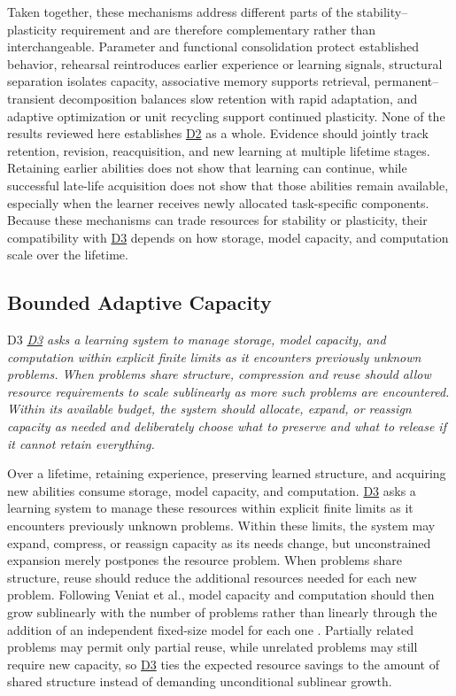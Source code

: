 \documentclass[10pt,journal,compsoc]{IEEEtran}
\DeclareRobustCommand{\Dref}[1]{\hyperref[sec:d#1]{D#1}}
\begin{document}
Taken together, these mechanisms address different parts of the stability--plasticity requirement and are therefore complementary rather than interchangeable.
Parameter and functional consolidation protect established behavior, rehearsal reintroduces earlier experience or learning signals, structural separation isolates capacity, associative memory supports retrieval, permanent--transient decomposition balances slow retention with rapid adaptation, and adaptive optimization or unit recycling support continued plasticity.
None of the results reviewed here establishes \Dref{2} as a whole.
Evidence should jointly track retention, revision, reacquisition, and new learning at multiple lifetime stages.
Retaining earlier abilities does not show that learning can continue, while successful late-life acquisition does not show that those abilities remain available, especially when the learner receives newly allocated task-specific components.
Because these mechanisms can trade resources for stability or plasticity, their compatibility with \Dref{3} depends on how storage, model capacity, and computation scale over the lifetime.

\subsection{Bounded Adaptive Capacity}
\label{sec:d3}

\begin{briefbox}[systembrief]{D3}
    \emph{\Dref{3} asks a learning system to manage storage, model capacity, and computation within explicit finite limits as it encounters previously unknown problems.
    When problems share structure, compression and reuse should allow resource requirements to scale sublinearly as more such problems are encountered.
    Within its available budget, the system should allocate, expand, or reassign capacity as needed and deliberately choose what to preserve and what to release if it cannot retain everything.}
\end{briefbox}

\noindent Over a lifetime, retaining experience, preserving learned structure, and acquiring new abilities consume storage, model capacity, and computation.
\Dref{3} asks a learning system to manage these resources within explicit finite limits as it encounters previously unknown problems.
Within these limits, the system may expand, compress, or reassign capacity as its needs change, but unconstrained expansion merely postpones the resource problem.
When problems share structure, reuse should reduce the additional resources needed for each new problem.
Following Veniat et al., model capacity and computation should then grow sublinearly with the number of problems rather than linearly through the addition of an independent fixed-size model for each one \cite{veniat2021}.
Partially related problems may permit only partial reuse, while unrelated problems may still require new capacity, so \Dref{3} ties the expected resource savings to the amount of shared structure instead of demanding unconditional sublinear growth.
\end{document}
